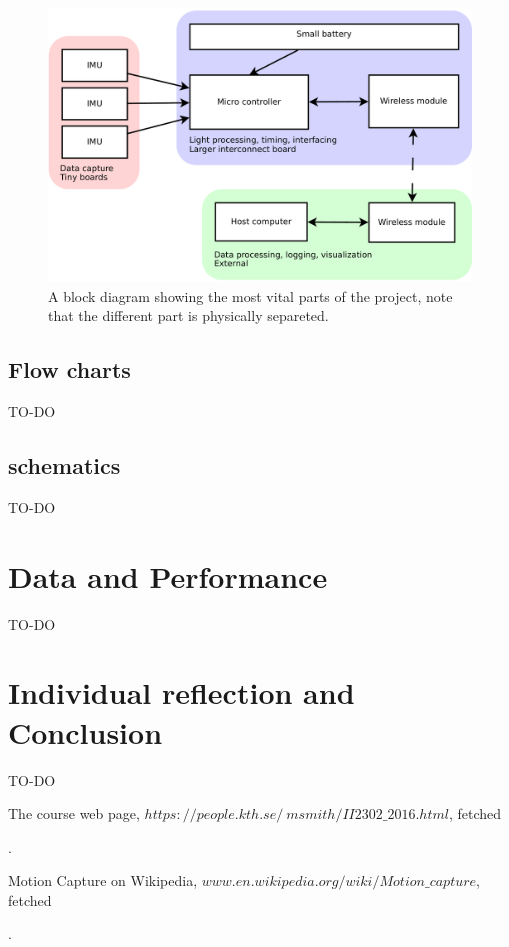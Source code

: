 \documentclass[a4paper, 12pt]{article}
\begin{document}
\begin{figure}[h!]
    \centering
    \includegraphics[scale=0.38]{block.pdf}
    \caption{A block diagram showing the most vital parts of the project, note that the different part is physically separeted.}
    \label{fig:pic2}
\end{figure}

\subsection*{Flow charts}
TO-DO
\subsection*{schematics}
TO-DO

\section*{Data and Performance}
TO-DO

\section*{Individual reflection and Conclusion}
TO-DO



\begin{thebibliography}{7}

	The course web page,
	\textit{$https://people.kth.se/~msmith/II2302\_2016.html$}, fetched \date{\today{}}.

	Motion Capture on Wikipedia,
	\textit{$www.en.wikipedia.org/wiki/Motion\_capture$}, fetched \date{\today{}}.


	


\end{thebibliography}
\end{document}
